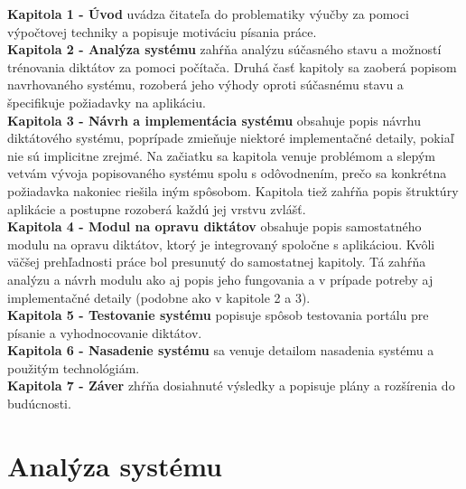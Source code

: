 \documentclass[12pt,oneside]{fithesis2}
\begin{document}
    \textbf{Kapitola 1 -  Úvod} uvádza čitateľa do problematiky výučby za pomoci výpočtovej techniky a popisuje motiváciu písania práce. \\
    \textbf{Kapitola 2 - Analýza systému} zahŕňa analýzu súčasného stavu a možností trénovania diktátov za pomoci počítača. Druhá časť kapitoly sa zaoberá popisom navrhovaného systému, rozoberá jeho výhody oproti súčasnému stavu a špecifikuje požiadavky na aplikáciu. \\
    \textbf{Kapitola 3 - Návrh a implementácia systému} obsahuje popis návrhu diktátového systému, poprípade zmieňuje niektoré implementačné detaily, pokiaľ nie sú implicitne zrejmé. Na začiatku sa kapitola venuje problémom a slepým vetvám vývoja popisovaného systému spolu s odôvodnením, prečo sa konkrétna požiadavka nakoniec riešila iným spôsobom. Kapitola tiež zahŕňa popis štruktúry aplikácie a postupne rozoberá každú jej vrstvu zvlášť. \\
    \textbf{Kapitola 4 - Modul na opravu diktátov} obsahuje popis samostatného modulu na opravu diktátov, ktorý je integrovaný spoločne s aplikáciou. Kvôli väčšej prehľadnosti práce bol presunutý do samostatnej kapitoly. Tá zahŕňa analýzu a návrh modulu ako aj popis jeho fungovania a v prípade potreby aj implementačné detaily (podobne ako v kapitole 2 a 3). \\
	\textbf{Kapitola 5 - Testovanie systému} popisuje spôsob testovania portálu pre písanie a vyhodnocovanie diktátov. \\
	\textbf{Kapitola 6 - Nasadenie systému} sa venuje detailom nasadenia systému a použitým technológiám. \\
	\textbf{Kapitola 7 - Záver} zhŕňa dosiahnuté výsledky a popisuje plány a rozšírenia do budúcnosti.
    
    
\chapter{Analýza systému}
\end{document}
